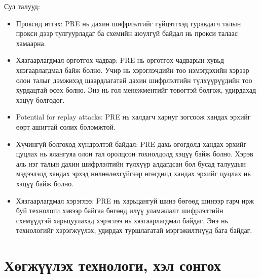 Сул талууд:
\begin{itemize}
    \item Проксид итгэх: PRE нь дахин шифрлэлтийг гүйцэтгхэд гуравдагч талын прокси дээр тулгуурладаг ба схемийн аюулгүй байдал нь прокси талаас хамаарна.
    \item Хязгаарлагдмал өргөтгөх чадвар: PRE нь өргөтгөх чадварын хувьд хязгаарлагдмал байж болно. Учир нь хэрэглэчдийн тоо нэмэгдэхийн хэрээр олон талыг дэмжихэд шаардлагатай дахин шифрлэлтийн түлхүүрүүдийн тоо хурдацтай өсөх болно. Энэ нь гол менежментийг төвөгтэй болгож, удирдахад хэцүү болгодог.
    \item Potential for replay attacks: PRE нь халдагч хариуг зогсоож хандах эрхийг өөрт ашигтай солих боломжтой. 
    \item Хүчингүй болгоход хүндрэлтэй байдал: PRE дахь өгөгдөлд хандах эрхийг цуцлах нь ялангуяа олон тал оролцсон тохиолдолд хэцүү байж болно. Хэрэв аль нэг талын дахин шифрлэлтийн түлхүүр алдагдсан бол бусад талуудын мэдээлэлд хандах эрхэд нөлөөлөхгүйгээр өгөгдөлд хандах эрхийг цуцлах нь хэцүү байж болно.
    \item Хязгаарлагдмал хэрэглээ: PRE нь харьцангуй шинэ бөгөөд шинээр гарч ирж буй технологи хэвээр байгаа бөгөөд илүү уламжлалт шифрлэлтийн схемүүдтэй харьцуулахад хэрэглээ нь хязгаарлагдмал байдаг. Энэ нь технологийг хэрэгжүүлэх, удирдах туршлагатай мэргэжилтнүүд бага байдаг.
\end{itemize}

\section{Хөгжүүлэх технологи, хэл сонгох}

